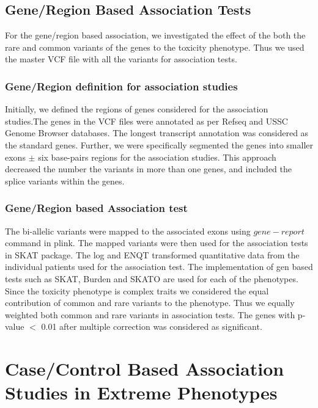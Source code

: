 \subsection{Gene/Region Based Association Tests}

For the gene/region based association, we investigated the effect of the both the rare and common variants of the genes to the toxicity phenotype. Thus we used the master VCF file with all the variants for association tests.

\subsubsection{Gene/Region definition for association studies}

Initially, we defined the regions of genes considered for the association studies.The genes in the VCF files were annotated as per Refseq \cite{pruitt2014refseq} and USSC Genome Browser \cite{karolchik2003ucsc} databases. The longest transcript annotation was considered as the standard genes. Further, we were specifically segmented the genes into smaller exons $\pm$ six base-pairs regions for the association studies. This approach decreased the number the variants in more than one genes, and included the splice variants within the genes.

\subsubsection{Gene/Region based Association test}

The bi-allelic variants were mapped to the associated exons using $gene-report$ command in plink. The mapped variants were then used for the association tests in SKAT \cite{SKAT} package. The log and ENQT transformed  quantitative data from the individual patients used for the association test. The implementation of gen based tests such as SKAT, Burden and SKATO are used for each of the phenotypes. Since the toxicity phenotype is complex traits we considered the equal contribution of common and rare variants to the phenotype. Thus we equally weighted both common and rare variants in association tests. The genes with p-value $<$ 0.01 after multiple correction was considered as significant. 


\section{Case/Control Based Association Studies in Extreme Phenotypes}
\label{Qualitative Trait Association studies}

